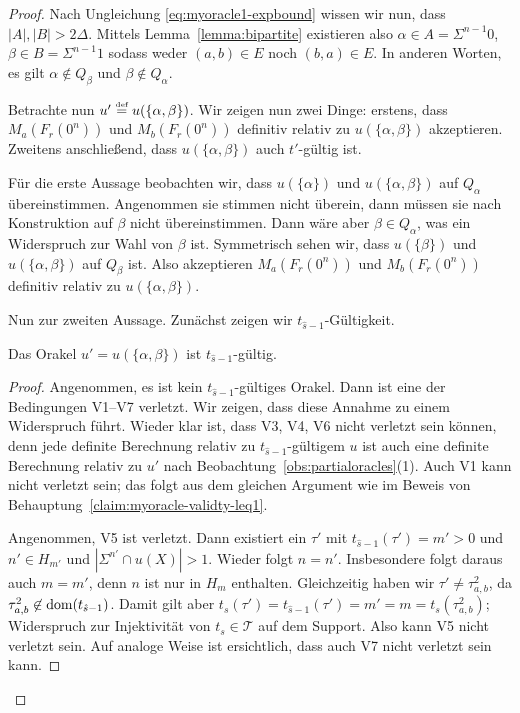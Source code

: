 \begin{proof}
Nach Ungleichung \eqref{eq:myoracle1-expbound} wissen wir nun, dass $|A|, |B|>2\Delta$. Mittels Lemma~\ref{lemma:bipartite} existieren also $\alpha\in A = \Sigma^{n-1}0$, $\beta\in B=\Sigma^{n-1}1$ sodass weder $(a,b)\in E$ noch $(b,a)\in E$.
In anderen Worten, es gilt $\alpha\not\in Q_\beta$ und $\beta\not\in Q_\alpha$.

Betrachte nun $u'\stackrel{\text{{\normalfont\tiny def}}}{=} u(\{\alpha, \beta\})$. Wir zeigen nun zwei Dinge: erstens, dass $M_a(F_r(0^n))$ und $M_b(F_r(0^n))$ definitiv relativ zu $u(\{\alpha, \beta\})$ akzeptieren.
Zweitens anschließend, dass $u(\{\alpha,\beta\})$ auch $t'$-gültig ist.

Für die erste Aussage beobachten wir, dass $u(\{\alpha\})$ und $u(\{\alpha, \beta\})$ auf $Q_\alpha$ übereinstimmen. Angenommen sie stimmen nicht überein, dann müssen sie nach Konstruktion auf $\beta$ nicht übereinstimmen. Dann wäre aber $\beta\in Q_\alpha$, was ein Widerspruch zur Wahl von $\beta$ ist.
Symmetrisch sehen wir, dass $u(\{\beta\})$ und $u(\{\alpha, \beta\})$ auf $Q_\beta$ ist.
Also akzeptieren $M_a(F_r(0^n))$ und $M_b(F_r(0^n))$ definitiv relativ zu $u(\{\alpha, \beta\})$.

Nun zur zweiten Aussage. Zunächst zeigen wir $t_{\hat{s}-1}$-Gültigkeit.
\begin{claim}\label{claim:myoracle-validty-eq2}
    Das Orakel $u'=u(\{\alpha, \beta\})$ ist $t_{\hat{s}-1}$-gültig.
\end{claim}
\begin{proof}
    Angenommen, es ist kein $t_{\hat{s}-1}$-gültiges Orakel. Dann ist eine der Bedingungen V1–V7 verletzt. Wir zeigen, dass diese Annahme zu einem Widerspruch führt.
    Wieder klar ist, dass V3, V4, V6 nicht verletzt sein können, denn jede definite Berechnung relativ zu $t_{\hat{s}-1}$-gültigem $u$ ist auch eine definite Berechnung relativ zu $u'$ nach Beobachtung~\ref{obs:partialoracles}(1).
    Auch V1 kann nicht verletzt sein; das folgt aus dem gleichen Argument wie im Beweis von Behauptung~\ref{claim:myoracle-validty-leq1}.

    Angenommen, V5 ist verletzt. Dann existiert ein $\tau'$ mit $t_{\hat{s}-1}(\tau')=m'>0$ und $n'\in H_{m'}$ und $|\Sigma^{n'}\cap u(X)|>1$. 
    Wieder folgt $n=n'$.
    Insbesondere folgt daraus auch $m=m'$, denn $n$ ist nur in $H_m$ enthalten.
    Gleichzeitig haben wir $\tau'\neq \tau^2_{a,b}$, da $\tau^2_{a,b}\not\in\operatorname{dom}(t_{\hat{s}-1})$.
    Damit gilt aber $t_s(\tau')=t_{\hat{s}-1}(\tau')=m'=m=t_s(\tau^2_{a,b})$; Widerspruch zur Injektivität von $t_s\in\mathcal T$ auf dem Support.
    Also kann V5 nicht verletzt sein. 
    Auf analoge Weise ist ersichtlich, dass auch V7 nicht verletzt sein kann.


\end{proof}
\end{proof}
